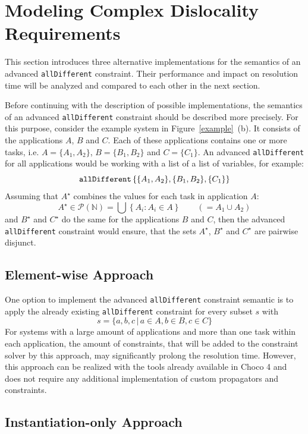 \documentclass[conference]{IEEEtran}
\begin{document}
\section{Modeling Complex Dislocality Requirements}

This section introduces three alternative implementations for the semantics of an advanced \texttt{allDifferent} constraint.
Their performance and impact on resolution time will be analyzed and compared to each other in the next section.

Before continuing with the description of possible implementations, the semantics of an advanced \texttt{allDifferent} constraint should be described more precisely.
For this purpose, consider the example system in Figure~\ref{example}~(b).
It consists of the applications $A$, $B$ and $C$.
Each of these applications contains one or more tasks, i.e. $A = \{A_1, A_2\}$, $B = \{B_1, B_2\}$ and $C = \{C_1\}$.
An advanced \texttt{allDifferent} for all applications would be working with a list of a list of variables, for example:
$$\textrm{\texttt{allDifferent}}\left\{\{A_1, A_2\}, \{B_1, B_2\}, \{C_1\}\right\}$$
Assuming that $A^\star$ combines the values for each task in application $A$:
$$A^\star \in \mathcal{P}(\mathbb{N}) = \bigcup \left\{A_i : A_i \in A\right\} \qquad ( = A_1\cup A_2)$$
and $B^\star$ and $C^\star$ do the same for the applications $B$ and $C$, then the advanced \texttt{allDifferent} constraint would ensure, that the sets $A^\star$, $B^\star$ and $C^\star$ are pairwise disjunct.

\subsection*{Element-wise Approach}

One option to implement the advanced \texttt{allDifferent} constraint semantic is to apply the already existing \texttt{allDifferent} constraint for every subset $s$ with
$$s = \{a,b,c \, \vert \, a \in A,  b \in B, c \in C\}$$
For systems with a large amount of applications and more than one task within each application, the amount of constraints, that will be added to the constraint solver by this approach, may significantly prolong the resolution time.
However, this approach can be realized with the tools already available in Choco 4 and does not require any additional implementation of custom propagators and constraints.

\subsection*{Instantiation-only Approach}
\end{document}
